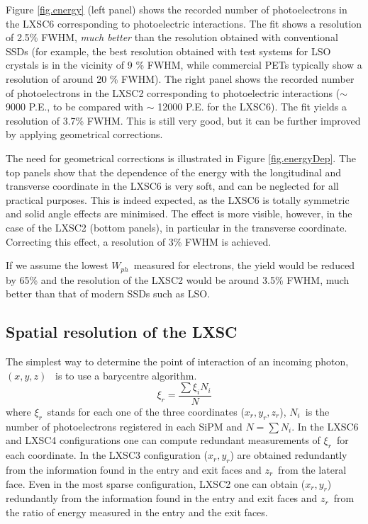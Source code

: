 \documentclass[a4paper,11pt,oneside]{article}
\begin{document}
Figure \ref{fig.energy} (left panel) shows the recorded number of photoelectrons in the LXSC6 corresponding to photoelectric interactions. The fit shows a resolution of 2.5\% FWHM, {\em much better} than the resolution obtained with conventional SSDs (for example, the best resolution obtained with test systems for LSO crystals is in the vicinity of 9 \% FWHM, while commercial PETs typically show a resolution of around 20 \% FWHM). The right panel shows the recorded number of photoelectrons in the LXSC2 corresponding to photoelectric interactions ($\sim$ 9000 P.E., to be compared with $\sim$ 12000 P.E. for the LXSC6). The  fit yields a resolution of 3.7\% FWHM. This is still very good, but it can be further improved by applying geometrical corrections.

The need for geometrical corrections is illustrated in Figure \ref{fig.energyDep}. The top panels show that the dependence of the energy with the longitudinal and transverse coordinate in the LXSC6 is very soft, and can be neglected for all practical purposes. This is indeed expected, as the LXSC6 is totally symmetric and solid angle effects are minimised. The effect is more visible, however, in the case of the LXSC2 (bottom panels), in particular in the transverse coordinate. Correcting this effect, a resolution of 3\% FWHM is achieved. 

If we assume the lowest $W_{ph}$~measured for electrons, the yield would be reduced by 65\% and the resolution of the LXSC2 would be around 3.5\% FWHM, much better than that of modern SSDs such as LSO. 


\subsection{Spatial resolution of the LXSC}
The simplest way to determine the point of interaction of an incoming photon, $(x,y,z)$~ is to use a barycentre algorithm. 
\[
\xi_r = \frac{\sum \xi_i N_i}{N}
\]
where $\xi_r$~stands for each one of the three coordinates ($x_r, y_r, z_r$), $N_i$~is the number of photoelectrons registered in each SiPM and $N=\sum N_i$. In the LXSC6 and LXSC4 configurations one can compute redundant measurements of $\xi_r$~for each coordinate. In the LXSC3 configuration ($x_r,y_r$) are obtained redundantly from the information found in the entry and exit faces and $z_r$~from the lateral face. Even in the most sparse configuration, LXSC2 one can obtain ($x_r,y_r$) redundantly from the information found in the entry and exit faces and $z_r$~from the ratio of energy measured in the entry and the exit faces. 
\end{document}

